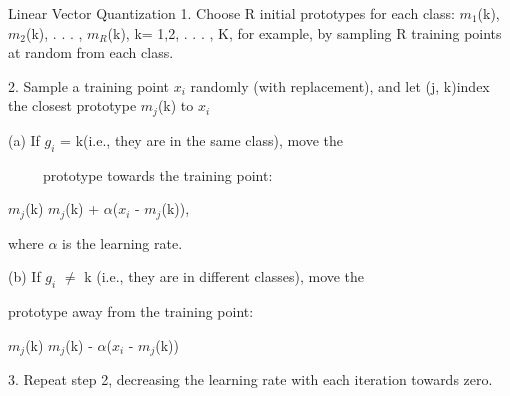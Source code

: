 \documentclass{beamer}
\begin{document}
\begin{frame}{Linear Vector Quantization}
1. Choose R initial prototypes for each class: $m_1$(k), $m_2$(k), . . . , $m_R$(k), k= 1,2, . . . , K, for example, by sampling R training points at random from each class.

\vspace{2 mm}
2. Sample a training point $x_i$ randomly (with replacement), and let (j, k)index the closest prototype $m_j$(k) to $x_i$

\vspace{2 mm}
\setlength{\parindent}{0.5cm}(a) If $g_i$ = k(i.e., they are in the same class), move the 

\ \ \ \ \ prototype towards the training point:
 \setlength{\parindent}{1.5cm}
 \vspace{2 mm}
 
 $m_j$(k)  \textleftarrow{}  $m_j$(k) + $\alpha$($x_i$ - $m_j$(k)),
 
 \vspace{2 mm}
 where $\alpha$ is the learning rate.
 
 \vspace{2 mm}
\setlength{\parindent}{0.5cm}


(b) If $g_i$ $\neq$ k (i.e., they are in different classes), move the


 prototype away from the training point:

 \vspace{2 mm}
\setlength{\parindent}{1.5cm}
 $m_j$(k)  \textleftarrow{}  $m_j$(k) - $\alpha$($x_i$ - $m_j$(k))
\setlength{\parindent}{0cm}

\vspace{2 mm}
3. Repeat step 2, decreasing the learning rate with each iteration towards zero.

\end{frame}
\end{document}
